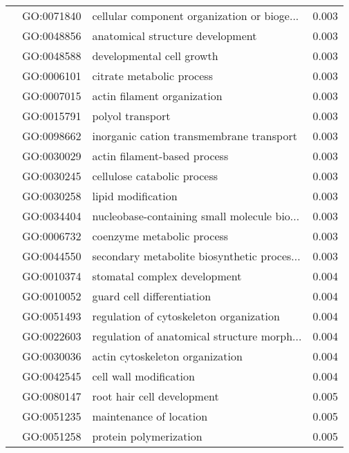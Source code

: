 \begin{longtable}{lllr}
   & GO:0071840 &  cellular component organization or bioge... &         0.003 \\
   & GO:0048856 &             anatomical structure development &         0.003 \\
   & GO:0048588 &                    developmental cell growth &         0.003 \\
   & GO:0006101 &                    citrate metabolic process &         0.003 \\
   & GO:0007015 &                  actin filament organization &         0.003 \\
   & GO:0015791 &                             polyol transport &         0.003 \\
   & GO:0098662 &     inorganic cation transmembrane transport &         0.003 \\
   & GO:0030029 &                 actin filament-based process &         0.003 \\
   & GO:0030245 &                  cellulose catabolic process &         0.003 \\
   & GO:0030258 &                           lipid modification &         0.003 \\
   & GO:0034404 &  nucleobase-containing small molecule bio... &         0.003 \\
   & GO:0006732 &                   coenzyme metabolic process &         0.003 \\
   & GO:0044550 &  secondary metabolite biosynthetic proces... &         0.003 \\
   & GO:0010374 &                 stomatal complex development &         0.004 \\
   & GO:0010052 &                   guard cell differentiation &         0.004 \\
   & GO:0051493 &      regulation of cytoskeleton organization &         0.004 \\
   & GO:0022603 &  regulation of anatomical structure morph... &         0.004 \\
   & GO:0030036 &              actin cytoskeleton organization &         0.004 \\
   & GO:0042545 &                       cell wall modification &         0.004 \\
   & GO:0080147 &                   root hair cell development &         0.005 \\
   & GO:0051235 &                      maintenance of location &         0.005 \\
   & GO:0051258 &                       protein polymerization &         0.005 \\

\end{longtable}
